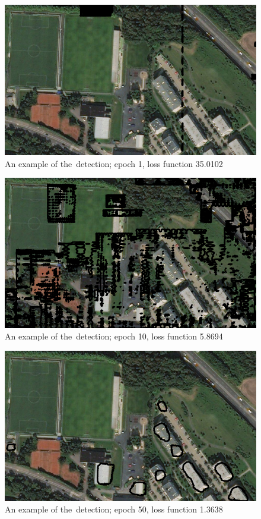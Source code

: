 \begin{figure}[H]
   \centering
	\includegraphics[width=.9\linewidth]{./pictures/out_b_1.png}
	\caption[Detection of buildings, example]{An example of the~detection; epoch
	1, loss function 35.0102}
      \label{fig:build-3}
\end{figure}

\begin{figure}[H]
   \centering
	\includegraphics[width=.9\linewidth]{./pictures/out_b_10.png}
	\caption[Detection of buildings, example]{An example of the~detection; epoch
	10, loss function 5.8694}
      \label{fig:build-2}
\end{figure}

\begin{figure}[H]
   \centering
	\includegraphics[width=.9\linewidth]{./pictures/out_b_50.png}
	\caption[Detection of buildings, example]{An example of the~detection; epoch
	50, loss function 1.3638}
      \label{fig:build-4}
\end{figure}

